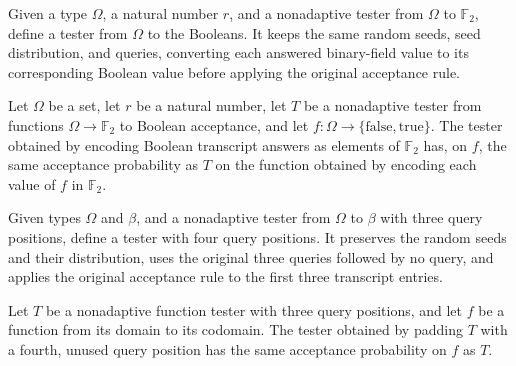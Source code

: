 \begin{definition}
\leanok
{}
Given a type $\Omega$, a natural number $r$, and a nonadaptive tester from $\Omega$ to
$\mathbb{F}_2$, define a tester from $\Omega$ to the Booleans. It keeps the same random
seeds, seed distribution, and queries, converting each answered binary-field value to
its corresponding Boolean value before applying the original acceptance rule.
\end{definition}

\begin{theorem}
\leanok
{}
Let $\Omega$ be a set, let $r$ be a natural number, let $T$ be a nonadaptive tester from
functions $\Omega\to\mathbb{F}_2$ to Boolean acceptance, and let
$f:\Omega\to\{\mathrm{false},\mathrm{true}\}$. The tester obtained by encoding Boolean
transcript answers as elements of $\mathbb{F}_2$ has, on $f$, the same acceptance
probability as $T$ on the function obtained by encoding each value of $f$ in
$\mathbb{F}_2$.
\end{theorem}

\begin{definition}
\label{FABL.padThreeQueryFunctionTester}
\leanok
{}
Given types $\Omega$ and $\beta$, and a nonadaptive tester from $\Omega$ to $\beta$ with
three query positions, define a tester with four query positions. It preserves the
random seeds and their distribution, uses the original three queries followed by no
query, and applies the original acceptance rule to the first three transcript entries.
\end{definition}

\begin{theorem}
\label{FABL.padThreeQueryFunctionTester_acceptanceProbability}
\leanok
{}
Let $T$ be a nonadaptive function tester with three query positions, and let $f$ be a
function from its domain to its codomain. The tester obtained by padding $T$ with a
fourth, unused query position has the same acceptance probability on $f$ as $T$.
\end{theorem}

